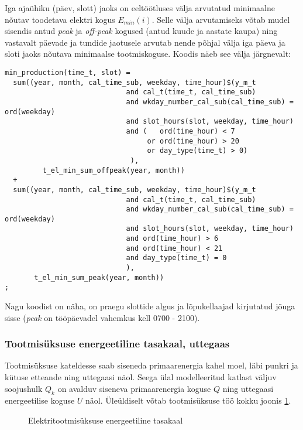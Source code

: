 \documentclass[10pt,a4paper]{article}
\begin{document}
Iga ajaühiku (päev, slott) jaoks on eeltöötluses välja arvutatud minimaalne nõutav toodetava elektri kogus $\mathit{E}_{min}(i)$. Selle välja arvutamiseks võtab mudel sisendis antud \emph{peak} ja \emph{off-peak} kogused (antud kuude ja aastate kaupa) ning vastavalt päevade ja tundide jaotusele arvutab nende põhjal välja iga päeva ja sloti jaoks nõutava minimaalse tootmiskoguse. Koodis näeb see välja järgnevalt:

\begin{verbatim}
min_production(time_t, slot) =
  sum((year, month, cal_time_sub, weekday, time_hour)$(y_m_t
                             and cal_t(time_t, cal_time_sub)
                             and wkday_number_cal_sub(cal_time_sub) = ord(weekday)
                             and slot_hours(slot, weekday, time_hour)
                             and (   ord(time_hour) < 7
                                  or ord(time_hour) > 20
                                  or day_type(time_t) > 0)
                              ),
         t_el_min_sum_offpeak(year, month))
  +
  sum((year, month, cal_time_sub, weekday, time_hour)$(y_m_t
                             and cal_t(time_t, cal_time_sub)
                             and wkday_number_cal_sub(cal_time_sub) = ord(weekday)
                             and slot_hours(slot, weekday, time_hour)
                             and ord(time_hour) > 6
                             and ord(time_hour) < 21
                             and day_type(time_t) = 0
                             ),
       t_el_min_sum_peak(year, month))
;
\end{verbatim}
Nagu koodist on näha, on praegu slottide algus ja lõpukellaajad kirjutatud jõuga sisse (\emph{peak} on tööpäevadel vahemkus kell 0700 - 2100).


\subsubsection{Tootmisüksuse energeetiline tasakaal, uttegaas}
Tootmisüksuse kateldesse saab siseneda primaarenergia kahel moel, läbi punkri ja kütuse etteande ning uttegaasi näol. Seega ülal modelleeritud katlast väljuv soojushulk $Q_k$ on avalduv siseneva primaarenergia koguse $Q$ ning uttegaasi energeetilise koguse $U$ näol.
Üleüldiselt võtab tootmisüksuse töö kokku joonis \ref{joon3}.

\begin{figure}

\caption{Elektritootmisüksuse energeetiline tasakaal
\label{joon3}}
\end{figure}
\end{document}
